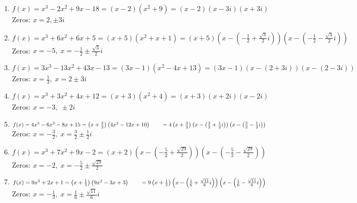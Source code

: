 \begin{enumerate}
\setcounter{enumi}{\value{HW}}


\item $f(x) = x^3-2x^2+9x-18 = (x-2) \left(x^2+9\right) = (x-2)(x-3i)(x+3i)$\\
Zeros:  $x=2, \pm 3i$

\item $f(x) = x^{3} + 6x^{2} + 6x + 5 = (x + 5)(x^{2} + x + 1) = (x + 5) \left( x - \left( -\frac{1}{2} + \frac{\sqrt{3}}{2}i \right) \right) \left( x - \left(-\frac{1}{2} - \frac{\sqrt{3}}{2}i \right) \right)$ \\
Zeros: $x = -5, \;  x = -\frac{1}{2} \pm \frac{\sqrt{3}}{2}i $

\item $f(x) = 3x^{3} - 13x^{2} + 43x - 13 = (3x - 1)(x^{2} - 4x + 13) = (3x - 1)(x - (2 + 3i))(x - (2 - 3i))$\\
Zeros: $x = \frac{1}{3}, \; x = 2 \pm 3i$



\item $f(x) = x^3 + 3x^2 + 4x + 12 = (x+3) \left(x^2 + 4 \right) = (x+3)(x+2i)(x-2i)$ \\
Zeros:  $x = -3, \; \pm 2i$

\item $f(x) = 4x^3-6x^2-8x+15 = \left(x + \frac{3}{2} \right) \left(4x^2-12x+10\right) \\
 \phantom{f(x)} = 4 \left(x + \frac{3}{2} \right) \left(x - \left( \frac{3}{2} + \frac{1}{2}i  \right) \right) \left(x - \left( \frac{3}{2} - \frac{1}{2}i  \right) \right)$\\
Zeros:  $x = - \frac{3}{2}, \; x = \frac{3}{2} \pm \frac{1}{2}i$


\item  $f(x) = x^3 + 7x^2+9x-2 = (x+2) \left(x - \left( -\frac{5}{2}+\frac{\sqrt{29}}{2}\right) \right) \left(x - \left( -\frac{5}{2}-\frac{\sqrt{29}}{2}\right) \right)$ \\
Zeros:  $x = -2, \; x = -\frac{5}{2} \pm \frac{\sqrt{29}}{2}$

\item  $f(x) = 9x^3+2x+1 = \left(x + \frac{1}{3}\right) \left(9x^2 - 3x + 3\right) \\
\phantom{f(x)}= 9\left(x + \frac{1}{3}\right) \left(x - \left(\frac{1}{6} + \frac{\sqrt{11}}{6} i \right) \right) \left(x - \left(\frac{1}{6} - \frac{\sqrt{11}}{6} i \right) \right)$\\
Zeros:  $x = -\frac{1}{3}, \; x = \frac{1}{6} \pm \frac{\sqrt{11}}{6} i$


\end{enumerate}
